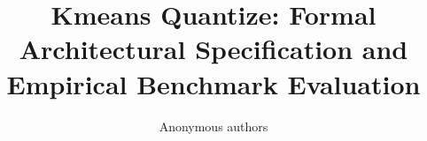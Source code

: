 \title{\textbf{Kmeans Quantize: Formal Architectural Specification and Empirical Benchmark Evaluation}}

\author{Anonymous authors}
